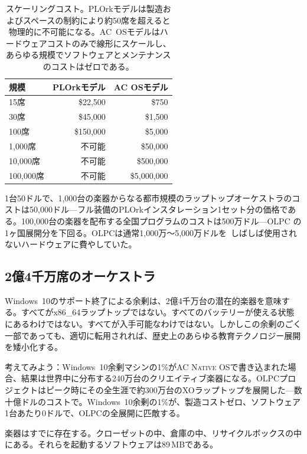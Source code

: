 \documentclass[10pt,letterpaper,twocolumn]{article}
\newcommand{\acos}{\textsc{AC Native OS}}
\begin{document}
\begin{table}[h]
\small
\centering
\begin{tabular}{lrr}
\toprule
\textbf{規模} & \textbf{PLOrkモデル} & \textbf{AC OSモデル} \\
\midrule
15席 & \$22,500 & \$750 \\
30席 & \$45,000 & \$1,500 \\
100席 & \$150,000 & \$5,000 \\
1,000席 & 不可能 & \$50,000 \\
10,000席 & 不可能 & \$500,000 \\
100,000席 & 不可能 & \$5,000,000 \\
\bottomrule
\end{tabular}
\caption{スケーリングコスト。PLOrkモデルは製造およびスペースの制約により約50席を超えると物理的に不可能になる。AC~OSモデルはハードウェアコストのみで線形にスケールし、あらゆる規模でソフトウェアとメンテナンスのコストはゼロである。}
\label{tab:scaling}
\end{table}

1台50ドルで、1,000台の楽器からなる都市規模のラップトップオーケストラのコストは50,000ドル---フル装備のPLOrkインスタレーション1セット分の価格である。100,000台の楽器を配布する全国プログラムのコストは500万ドル---OLPC の1ヶ国展開分を下回る。OLPCは通常1,000万〜5,000万ドルを~\citep{kraemer2009olpc}しばしば使用されないハードウェアに費やしていた。

\subsection{2億4千万席のオーケストラ}

Windows~10のサポート終了による余剰は、2億4千万台の潜在的楽器を意味する。すべてがx86\_64ラップトップではない。すべてのバッテリーが使える状態にあるわけではない。すべてが入手可能なわけではない。しかしこの余剰のごく一部であっても、適切に転用されれば、歴史上のあらゆる教育テクノロジー展開を矮小化する。

考えてみよう：Windows~10余剰マシンの1\%が\acos{}で書き込まれた場合、結果は世界中に分布する240万台のクリエイティブ楽器になる。OLPCプロジェクトはピーク時にその全生涯で約300万台のXOラップトップを展開した---数十億ドルのコストで。Windows~10余剰の1\%が、製造コストゼロ、ソフトウェア1台あたり0ドルで、OLPCの全展開に匹敵する。

楽器はすでに存在する。クローゼットの中、倉庫の中、リサイクルボックスの中にある。それらを起動するソフトウェアは89\,MBである。

\end{document}
